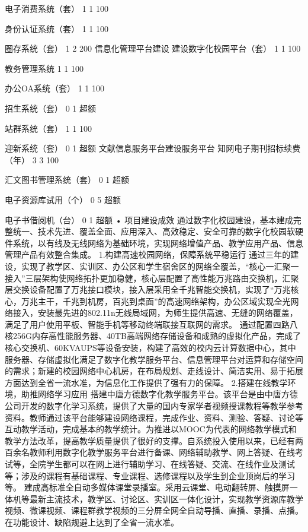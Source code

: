 电子消费系统（套）
1
1
100%

身份认证系统（套）
1
1
100%

圈存系统（套）
1
2
200%
信息化管理平台建设
建设数字化校园平台（套）
1
1
100%

教务管理系统
1
1
100%

办公OA系统（套）
1
1
100%

招生系统（套）
0
1
超额

站群系统（套）
1
1
100%

迎新系统（套）
0
1
超额
文献信息服务平台建设服务平台
知网电子期刊招标续费（年）
3
3
100%

汇文图书管理系统（套）
0
1
超额

电子资源库试用（个）
0
5
超额

电子书借阅机（台）
0
1
超额
	•	项目建设成效
通过数字化校园建设，基本建成完整统一、技术先进、覆盖全面、应用深入、高效稳定、安全可靠的数字化校园软硬件系统，以有线及无线网络为基础环境，实现网络增值产品、教学应用产品、信息管理产品有效整合集成。
1.构建高速校园网络，保障系统平稳运行
通过三年的建设，实现了教学区、实训区、办公区和学生宿舍区的网络全覆盖，“核心一汇聚一接入”三层架构使网络拓扑更加稳健，核心层配置了高性能万兆路由交换机，汇聚层交换设备配置了万兆接口模块，接入层采用全千兆智能交换机，实现了“万兆核心，万兆主干，千兆到机房，百兆到桌面”的高速网络架构，办公区域实现全光网络接入，安装最先进的802.11n无线局域网，为师生提供高速、无缝的网络覆盖，满足了用户使用平板、智能手机等移动终端联接互联网的需求。
通过配置四路八核256G内存高性能服务器、40TB高端网络存储设备和成熟的虚拟化产品，完成了核心交换机、60KVAUPS等设备安装，构建了高效的校内云计算数据中心，其中服务器、存储虚拟化满足了数字化教学服务平台、信息管理平台对运算和存储空间的需求；新建的校园网络中心机房，在布局规划、走线设计、简洁实用、易于拓展方面达到全省一流水准，为信息化工作提供了强有力的保障。
2.搭建在线教学环境，助推网络学习应用
搭建中唐方德数字化教学服务平台。该平台是由中唐方德公司开发的数字化学习系统，提供了大量的国内专家学者视频授课教程等教学参考资料。教师通过该平台能够建设网络课程，完成作业、资料、测验、答疑、讨论等互动教学活动，完成基本的教学统计。为推进以MOOC为代表的网络教学模式和教学方法改革，提高教学质量提供了很好的支撑。自系统投入使用以来，已经有两百余名教师利用数字化教学服务平台进行备课、网络辅助教学、网上答疑、在线考试等，全院学生都可以在网上进行辅助学习、在线答疑、交流、在线作业及测试等；涉及的课程有基础课程、专业课程、选修课程以及学生到企业顶岗后的学习等。
建成高标准全自动多媒体课堂录播室。采用云课堂、电动翻转屏、触摸屏一体机等最新主流技术，教学区、讨论区、实训区一体化设计，实现教学资源库教学视频、微课视频、课程群教学视频的三分屏全网全自动导播、直播、录播、点播。在功能设计、缺陷规避上达到了全省一流水准。
